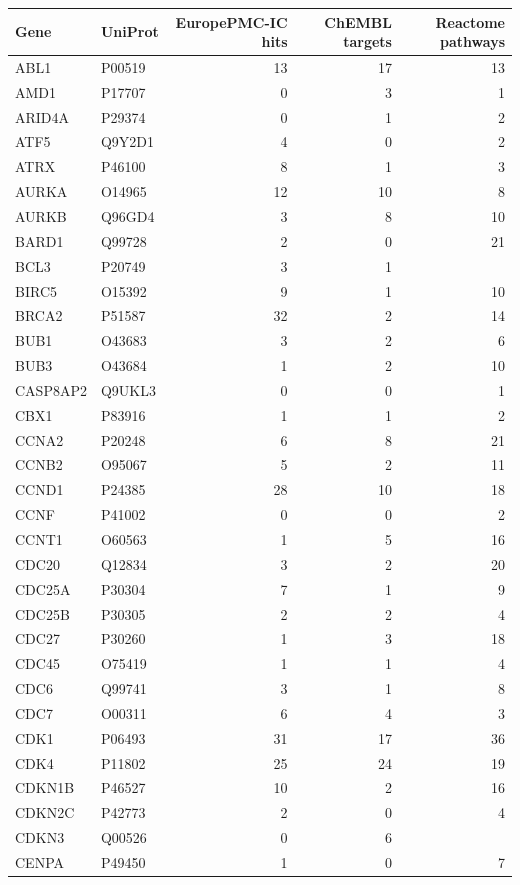 \begin{longtable}{llrrr}
\hline\hline Gene & UniProt & EuropePMC-IC hits & ChEMBL targets & Reactome pathways \\
\hline\endhead
ABL1 & P00519 & 13 & 17 & 13 \\
AMD1 & P17707 & 0 & 3 & 1 \\
ARID4A & P29374 & 0 & 1 & 2 \\
ATF5 & Q9Y2D1 & 4 & 0 & 2 \\
ATRX & P46100 & 8 & 1 & 3 \\
AURKA & O14965 & 12 & 10 & 8 \\
AURKB & Q96GD4 & 3 & 8 & 10 \\
BARD1 & Q99728 & 2 & 0 & 21 \\
BCL3 & P20749 & 3 & 1 &  \\
BIRC5 & O15392 & 9 & 1 & 10 \\
BRCA2 & P51587 & 32 & 2 & 14 \\
BUB1 & O43683 & 3 & 2 & 6 \\
BUB3 & O43684 & 1 & 2 & 10 \\
CASP8AP2 & Q9UKL3 & 0 & 0 & 1 \\
CBX1 & P83916 & 1 & 1 & 2 \\
CCNA2 & P20248 & 6 & 8 & 21 \\
CCNB2 & O95067 & 5 & 2 & 11 \\
CCND1 & P24385 & 28 & 10 & 18 \\
CCNF & P41002 & 0 & 0 & 2 \\
CCNT1 & O60563 & 1 & 5 & 16 \\
CDC20 & Q12834 & 3 & 2 & 20 \\
CDC25A & P30304 & 7 & 1 & 9 \\
CDC25B & P30305 & 2 & 2 & 4 \\
CDC27 & P30260 & 1 & 3 & 18 \\
CDC45 & O75419 & 1 & 1 & 4 \\
CDC6 & Q99741 & 3 & 1 & 8 \\
CDC7 & O00311 & 6 & 4 & 3 \\
CDK1 & P06493 & 31 & 17 & 36 \\
CDK4 & P11802 & 25 & 24 & 19 \\
CDKN1B & P46527 & 10 & 2 & 16 \\
CDKN2C & P42773 & 2 & 0 & 4 \\
CDKN3 & Q00526 & 0 & 6 &  \\
CENPA & P49450 & 1 & 0 & 7 \\

\end{longtable}
